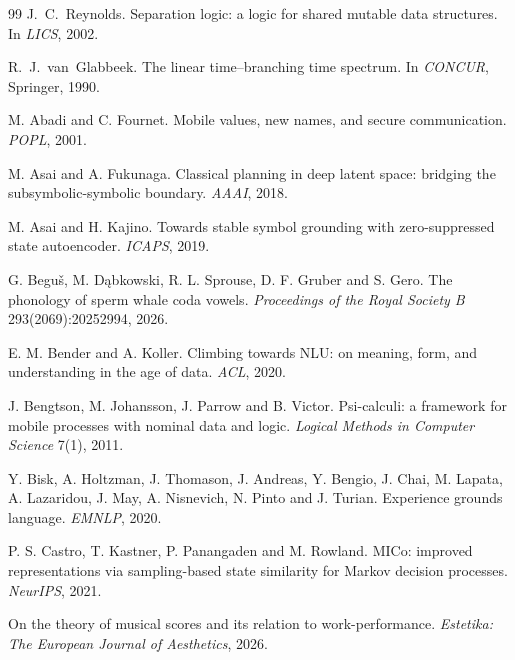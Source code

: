 \begin{thebibliography}{99}
J.~C.~Reynolds.
\newblock Separation logic: a logic for shared mutable data structures.
\newblock In \emph{LICS}, 2002.

R.~J.~van~Glabbeek.
\newblock The linear time--branching time spectrum.
\newblock In \emph{CONCUR}, Springer, 1990.


 M. Abadi and C. Fournet. Mobile values, new names, and secure
communication. \emph{POPL}, 2001.

 M. Asai and A. Fukunaga. Classical planning in deep latent space:
bridging the subsymbolic-symbolic boundary. \emph{AAAI}, 2018.

 M. Asai and H. Kajino. Towards stable symbol grounding with
zero-suppressed state autoencoder. \emph{ICAPS}, 2019.

 G. Begu\v{s}, M. D\k{a}bkowski, R. L. Sprouse, D. F. Gruber and
S. Gero. The phonology of sperm whale coda vowels. \emph{Proceedings of the Royal
Society B} 293(2069):20252994, 2026.

 E. M. Bender and A. Koller. Climbing towards NLU: on meaning,
form, and understanding in the age of data. \emph{ACL}, 2020.

 J. Bengtson, M. Johansson, J. Parrow and B. Victor. Psi-calculi: a
framework for mobile processes with nominal data and logic. \emph{Logical Methods in
Computer Science} 7(1), 2011.

 Y. Bisk, A. Holtzman, J. Thomason, J. Andreas, Y. Bengio, J. Chai,
M. Lapata, A. Lazaridou, J. May, A. Nisnevich, N. Pinto and J. Turian. Experience grounds
language. \emph{EMNLP}, 2020.

 P. S. Castro, T. Kastner, P. Panangaden and M. Rowland. MICo:
improved representations via sampling-based state similarity for Markov decision
processes. \emph{NeurIPS}, 2021.

 On the theory of musical scores and its relation to
work-performance. \emph{Estetika: The European Journal of Aesthetics}, 2026.


\end{thebibliography}
